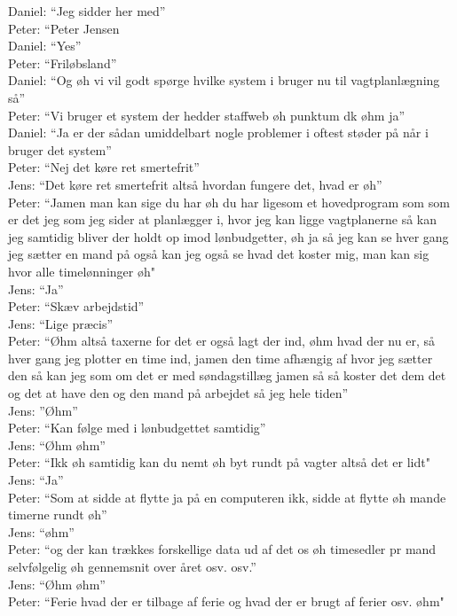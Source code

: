 Daniel: “Jeg sidder her med”\\
Peter: “Peter Jensen\\
Daniel: “Yes”\\
Peter: “Friløbsland” \\
Daniel: “Og øh vi vil godt spørge hvilke system i bruger nu til vagtplanlægning så”\\
Peter: “Vi bruger et system der hedder staffweb øh punktum dk øhm ja”\\
Daniel: “Ja er der sådan umiddelbart nogle problemer i oftest støder på når i bruger det system”\\
Peter: “Nej det køre ret smertefrit” \\
Jens: “Det køre ret smertefrit altså hvordan fungere det, hvad er øh”\\
Peter: “Jamen man kan sige du har øh du har ligesom et hovedprogram som som er det jeg  som jeg sider at planlægger i, hvor jeg kan ligge vagtplanerne så kan jeg samtidig bliver der holdt op imod lønbudgetter, øh ja så jeg kan se hver gang jeg sætter en mand på også kan jeg også se hvad det koster mig, man kan sig hvor alle timelønninger øh"\\
Jens: “Ja”\\
Peter: “Skæv arbejdstid”\\
Jens: “Lige præcis”\\
Peter: “Øhm altså taxerne for det er også lagt der ind, øhm hvad der nu er, så hver gang jeg plotter en time ind, jamen den time afhængig af hvor jeg sætter den så kan jeg som om det er med søndagstillæg jamen så så koster det dem det og det at have den og den mand på arbejdet så jeg hele tiden”\\
Jens: ”Øhm”\\
Peter: “Kan følge med i lønbudgettet samtidig”\\
Jens: “Øhm øhm”\\
Peter: “Ikk øh samtidig kan du nemt øh byt rundt på vagter altså det er lidt"\\
Jens: “Ja”\\
Peter: “Som at sidde at flytte ja på en computeren ikk, sidde at flytte øh mande timerne rundt øh”\\
Jens: “øhm”\\
Peter: “og der kan trækkes forskellige data ud af det os øh timesedler pr mand selvfølgelig øh gennemsnit over året osv. osv.”\\
Jens: “Øhm øhm”\\
Peter: “Ferie hvad der er tilbage af ferie og hvad der er brugt af ferier osv. øhm"\\
